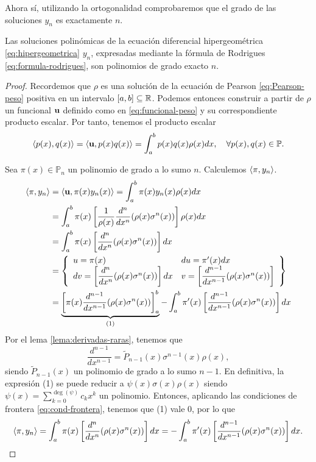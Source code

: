 Ahora sí, utilizando la ortogonalidad comprobaremos que el grado de las soluciones $y_n$ es exactamente $n$.

\begin{proposicion}
    \label{prop:grado-rodrigues}
    Las soluciones polinómicas de la ecuación diferencial hipergeométrica \eqref{eq:hipergeometrica} $y_n$, expresadas mediante la fórmula de Rodrigues \eqref{eq:formula-rodrigues}, son polinomios de grado exacto $n$.
\end{proposicion}
\begin{proof}
    Recordemos que $\rho$ es una solución de la ecuación de Pearson \eqref{eq:Pearson-peso} positiva en un intervalo $[a,b]\subseteq \mathbb{R}$. Podemos entonces construir a partir de $\rho$ un funcional $\mathbf{u}$ definido como en \eqref{eq:funcional-peso} y su correspondiente producto escalar. Por tanto, tenemos el producto escalar
    $$
    \left\langle p(x) , q(x) \right\rangle = \left\langle \mathbf{u} , p(x)q(x) \right\rangle = \int_a^b p(x)q(x)\rho(x)dx, \ \ \ \forall p(x),q(x)\in\mathbb{P}. 
    $$

    Sea $\pi(x)\in\mathbb{P}_n$ un polinomio de grado a lo sumo $n$. Calculemos $\left\langle \pi , y_n \right\rangle$.
    \begin{equation*}
        \begin{split}
            \left\langle \pi , y_n \right\rangle &= \left\langle \mathbf{u} , \pi(x)y_n(x) \right\rangle = \int_a^b \pi(x)y_n(x)\rho(x)dx \\
            &= \int_a^b \pi(x)\left[\dfrac 1 {\rho(x)} \dfrac{d^n}{dx^n} (\rho(x) \sigma^n(x))\right]\rho(x)dx \\
            &= \int_a^b \pi(x)\left[\dfrac{d^n}{dx^n} (\rho(x) \sigma^n(x))\right]dx \\
            &= \left\{\begin{array}{ll}
                u=\pi(x) & du = \pi'(x)dx\\
                dv =  \left[\dfrac{d^n}{dx^n} (\rho(x) \sigma^n(x))\right]dx  & v=\left[\dfrac{d^{n-1}}{dx^{n-1}} (\rho(x) \sigma^n(x))\right]
             \end{array}\right\} \\
            &= \underbrace{\left[\pi(x)\dfrac{d^{n-1}}{dx^{n-1}} (\rho(x) \sigma^n(x))\right]_a^b}_{(1)} - \int_a^b \pi'(x)\left[\dfrac{d^{n-1}}{dx^{n-1}} (\rho(x) \sigma^n(x))\right]dx \\
        \end{split}
    \end{equation*}
    Por el lema \ref{lema:derivadas-raras}, tenemos que
    $$
    \dfrac{d^{n-1}}{dx^{n-1}} = \tilde P_{n-1}(x) \sigma^{n-1}(x)\rho(x),
    $$
    siendo $\tilde P_{n-1}(x)$ un polinomio de grado a lo sumo $n-1$. En definitiva, la expresión (1) se puede reducir a $\psi(x)\sigma(x)\rho(x)$ siendo $\psi(x)=\displaystyle\sum_{k=0}^{\deg(\psi)}c_k x^k$ un polinomio. Entonces, aplicando las condiciones de frontera \eqref{eq:cond-frontera}, tenemos que (1) vale $0$, por lo que
    $$
    \left\langle \pi , y_n \right\rangle = \int_a^b \pi(x)\left[\dfrac{d^n}{dx^n} (\rho(x) \sigma^n(x))\right]dx = - \int_a^b \pi'(x)\left[\dfrac{d^{n-1}}{dx^{n-1}} (\rho(x) \sigma^n(x))\right]dx.
    $$


\end{proof}
